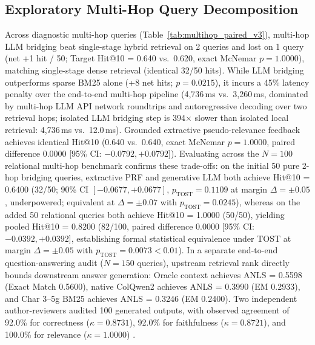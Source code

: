 \subsection{Exploratory Multi-Hop Query Decomposition}
\label{sec:multihop_reasoning}
Across diagnostic multi-hop queries (Table~\ref{tab:multihop_paired_v3}), multi-hop LLM bridging beat single-stage hybrid retrieval on 2 queries and lost on 1 query (net +1 hit / 50; Target Hit@10 = 0.640 vs.\ 0.620, exact McNemar $p = 1.0000$), matching single-stage dense retrieval (identical 32/50 hits). While LLM bridging outperforms sparse BM25 alone (+8 net hits; $p = 0.0215$), it incurs a 45\% latency penalty over the end-to-end multi-hop pipeline (4,736\,ms vs.\ 3,260\,ms, dominated by multi-hop LLM API network roundtrips and autoregressive decoding over two retrieval hops; isolated LLM bridging step is 394$\times$ slower than isolated local retrieval: 4,736\,ms vs.\ 12.0\,ms). Grounded extractive pseudo-relevance feedback achieves identical Hit@10 (0.640 vs.\ 0.640, exact McNemar $p = 1.0000$, paired difference $0.0000$ [95\% CI: $-0.0792, +0.0792$]). Evaluating across the $N=100$ relational multi-hop benchmark confirms these trade-offs: on the initial 50 pure 2-hop bridging queries, extractive PRF and generative LLM both achieve Hit@10 = 0.6400 (32/50; 90\% CI $[-0.0677, +0.0677]$, $p_{\text{TOST}}=0.1109$ at margin $\Delta=\pm 0.05$, underpowered; equivalent at $\Delta=\pm 0.07$ with $p_{\text{TOST}}=0.0245$), whereas on the added 50 relational queries both achieve Hit@10 = 1.0000 (50/50), yielding pooled Hit@10 = $0.8200$ (82/100, paired difference $0.0000$ [95\% CI: $-0.0392, +0.0392$], establishing formal statistical equivalence under TOST at margin $\Delta = \pm 0.05$ with $p_{\text{TOST}} = 0.0073 < 0.01$). In a separate end-to-end question-answering audit ($N=150$ queries), upstream retrieval rank directly bounds downstream answer generation: Oracle context achieves ANLS = 0.5598 (Exact Match 0.5600), native ColQwen2 achieves ANLS = 0.3990 (EM 0.2933), and Char 3--5g BM25 achieves ANLS = 0.3246 (EM 0.2400). Two independent author-reviewers audited 100 generated outputs, with observed agreement of 92.0\% for correctness ($\kappa = 0.8731$), 92.0\% for faithfulness ($\kappa = 0.8721$), and 100.0\% for relevance ($\kappa = 1.0000$) \cite{zheng2023judging}.

